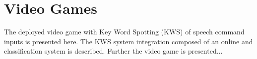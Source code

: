 
\chapter{Video Games}\label{sec:game}
The deployed video game with Key Word Spotting (KWS) of speech command inputs is presented here.
The KWS system integration composed of an online and classification system is described.
Further the video game is presented...



